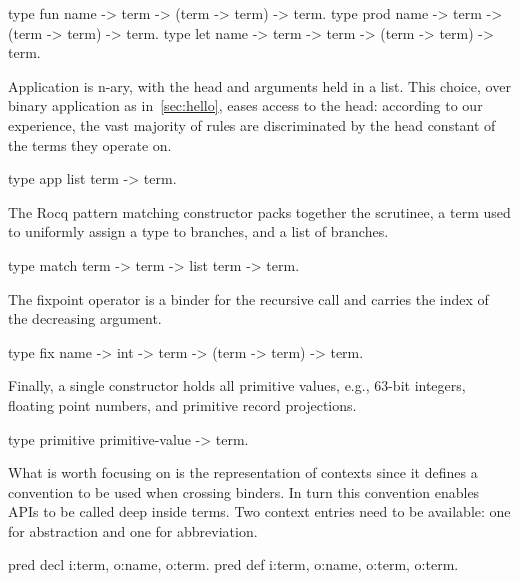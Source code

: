 \documentclass{these-ISSS}
\newenvironment{elpicode}
  {\VerbatimEnvironment\begin{elpibox}\begin{xelpicode}}{\end{xelpicode}
\end{elpibox}}
\begin{document}
\begin{elpicode}
type fun  name -> term -> (term -> term) -> term.            %
type prod name -> term -> (term -> term) -> term.            %
type let  name -> term -> term -> (term -> term) -> term.    %
\end{elpicode}

\noindent
Application is n-ary, with the head and arguments held in a list. This choice,
over binary application as in~\cref{sec:hello}, eases access to the head:
according to our experience, the vast majority of rules are discriminated by
the head constant of the terms they operate on.
\begin{elpicode}
type app       list term -> term.                     
\end{elpicode}
\noindent
The Rocq pattern matching constructor packs together the scrutinee, a term
used to uniformly assign a type to branches, and a list of branches.
\begin{elpicode}
type match     term -> term -> list term -> term.   
\end{elpicode}
\noindent
The
fixpoint operator is a binder for the recursive call and carries the index of
the decreasing argument. 
\begin{elpicode}
type fix       name -> int -> term -> (term -> term) -> term.
\end{elpicode}
\noindent
Finally, a single constructor holds all primitive
values, e.g., 63-bit integers, floating point numbers, and primitive record
projections.
\begin{elpicode}
type primitive primitive-value -> term.
\end{elpicode}
What is worth focusing on is the representation of contexts since it
defines a convention to be used when crossing binders. In turn
this convention enables APIs to be called deep inside terms. Two
context entries need to be available: one for abstraction and one for
abbreviation.

\begin{elpicode}
pred decl i:term, o:name, o:term.                 %
pred def  i:term, o:name, o:term, o:term.         %
\end{elpicode}
\end{document}
